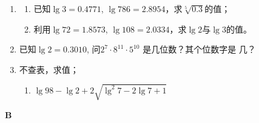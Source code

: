 \begin{enumerate}
\item \begin{enumerate}[(1)]
    \item 已知$\lg3=0.4771$, $\lg786=2.8954$，求$\sqrt[5]{0.3}$的值；
\item 利用$\lg72=1.8573$, $\lg108=2.0334$，求$\lg2$与$\lg3$的值。
\end{enumerate}

\item 已知$\lg2=0.3010$, 问$2^7\cdot 8^{11}\cdot 5^{10}$
是几位数？其个位数字是
几？
\item 不查表，求值；
\begin{enumerate}[(1)]
    \item $\lg 98-\lg 2+2\sqrt{\lg^2 7-2\lg 7+1}$
\end{enumerate}
\end{enumerate}

\begin{center}
    \bfseries B
\end{center}
    
